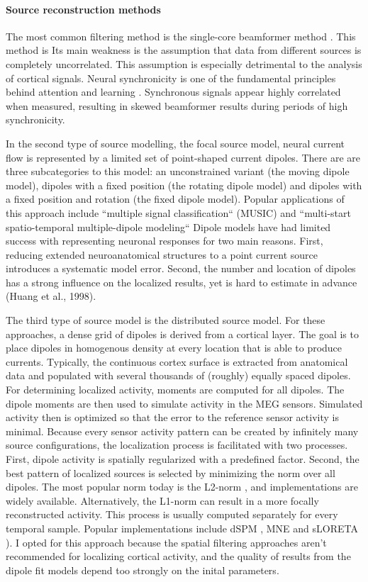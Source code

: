 \paragraph{Source reconstruction methods}
The most common filtering method is the single-core beamformer method \cite{1.5.Beamformer-a, 1.5.Beamformer-b}.
This method is 
Its main weakness is the assumption that data from different sources is completely uncorrelated.
This assumption is especially detrimental to the analysis of cortical signals.
Neural synchronicity is one of the fundamental principles behind attention and learning \cite{1.5.synchronicity}.
Synchronous signals appear highly correlated when measured, resulting in skewed beamformer results during periods of high synchronicity.

In the second type of source modelling, the focal source model, neural current flow is represented by a limited set of point-shaped current dipoles.
There are are three subcategories to this model: an unconstrained variant (the moving dipole model), dipoles with a fixed position (the rotating dipole model) and dipoles with a fixed position and rotation (the fixed dipole model).
Popular applications of this approach include ``multiple signal classification`` (MUSIC) \cite{1.5.music} and ``multi-start spatio-temporal multiple-dipole modeling`` \cite{1.5.simplex}
Dipole models have had limited success with representing neuronal responses for two main reasons.
First, reducing extended neuroanatomical structures to a point current source introduces a systematic model error.
Second, the number and location of dipoles has a strong influence on the localized results, yet is hard to estimate in advance (Huang et al., 1998).

The third type of source model is the distributed source model.
For these approaches, a dense grid of dipoles is derived from a cortical layer.
The goal is to place dipoles in homogenous density at every location that is able to produce currents.
Typically, the continuous cortex surface is extracted from anatomical data and populated with several thousands of (roughly) equally spaced dipoles.
For determining localized activity, moments are computed for all dipoles.
The dipole moments are then used to simulate activity in the MEG sensors.
Simulated activity then is optimized so that the error to the reference sensor activity is minimal.
Because every sensor activity pattern can be created by infinitely many source configurations, the localization process is facilitated with two processes.
First, dipole activity is spatially regularized with a predefined factor.
Second, the best pattern of localized sources is selected by minimizing the norm over all dipoles.
The most popular norm today is the L2-norm \cite{1.5.L2}, and implementations are widely available.
Alternatively, the L1-norm \cite{1.5.L1} can result in a more focally reconstructed activity.
This process is usually computed separately for every temporal sample.
Popular implementations include dSPM \cite{1.5.dSPM}, MNE \cite{1.5.MNE} and sLORETA \cite{1.5.sLORETA}).
I opted for this approach because the spatial filtering approaches aren't recommended for localizing cortical activity, and the quality of results from the dipole fit models depend too strongly on the inital parameters.

